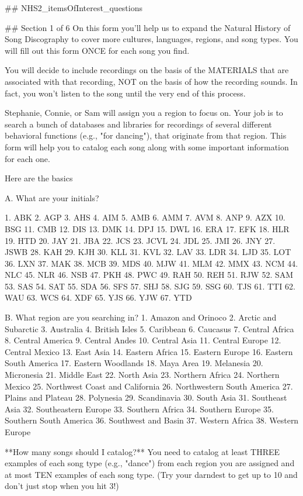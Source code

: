 ## NHS2_itemsOfInterest_questions

## Section 1 of 6
On this form you'll help us to expand the Natural History of Song Discography to cover more cultures, languages, regions, and song types. You will fill out this form ONCE for each song you find.

You will decide to include recordings on the basis of the MATERIALS that are associated with that recording, NOT on the basis of how the recording sounds. In fact, you won't listen to the song until the very end of this process.

Stephanie, Connie, or Sam will assign you a region to focus on. Your job is to search a bunch of databases and libraries for recordings of several different behavioral functions (e.g., "for dancing"), that originate from that region. This form will help you to catalog each song along with some important information for each one.

Here are the basics

A.  What are your initials?

1. ABK
2. AGP
3. AHS
4. AIM
5. AMB
6. AMM
7. AVM
8. ANP
9. AZX
10. BSG
11. CMB
12. DIS
13. DMK
14. DPJ
15. DWL
16. ERA
17. EFK
18. HLR
19. HTD
20. JAY
21. JBA
22. JCS
23. JCVL
24. JDL
25. JMI
26. JNY
27. JSWB
28. KAH
29. KJH
30. KLL
31. KVL
32. LAV
33. LDR
34. LJD
35. LOT
36. LXN
37. MAK
38. MCB
39. MDS
40. MJW
41. MLM
42. MMX
43. NCM
44. NLC
45. NLR
46. NSB
47. PKH
48. PWC
49. RAH
50. REH
51. RJW
52. SAM
53. SAS
54. SAT
55. SDA
56. SFS
57. SHJ
58. SJG
59. SSG
60. TJS
61. TTI
62. WAU
63. WCS
64. XDF
65. YJS
66. YJW
67. YTD


B. What region are you searching in?
1. Amazon and Orinoco
2. Arctic and Subarctic
3. Australia
4. British Isles
5. Caribbean
6. Caucasus
7. Central Africa
8. Central America
9. Central Andes
10. Central Asia
11. Central Europe
12. Central Mexico
13. East Asia
14. Eastern Africa
15. Eastern Europe
16. Eastern South America
17. Eastern Woodlands
18. Maya Area
19. Melanesia
20. Micronesia
21. Middle East
22. North Asia
23. Northern Africa
24. Northern Mexico
25. Northwest Coast and California
26. Northwestern South America
27. Plains and Plateau
28. Polynesia
29. Scandinavia
30. South Asia
31. Southeast Asia
32. Southeastern Europe
33. Southern Africa
34. Southern Europe
35. Southern South America
36. Southwest and Basin
37. Western Africa
38. Western Europe

**How many songs should I catalog?**
You need to catalog at least THREE examples of each song type (e.g., "dance") from each region you are assigned and at most TEN examples of each song type. (Try your darndest to get up to 10 and don't just stop when you hit 3!)

